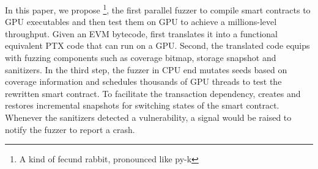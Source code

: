 In this paper, we propose {\tool}\footnote{A kind of fecund rabbit, pronounced like py-k}, the first parallel fuzzer to compile smart contracts to GPU executables and then test them on GPU to achieve a millions-level throughput.   
Given an EVM bytecode, {\tool} first translates it into a functional equivalent PTX code that can run on a GPU. 
Second, the translated code equips with fuzzing components such as coverage bitmap, storage snapshot and sanitizers. 
In the third step, the fuzzer in CPU end mutates seeds based on coverage information and schedules thousands of GPU threads to test the rewritten smart contract.
To facilitate the transaction dependency, {\tool} creates and restores incremental snapshots for switching states of the smart contract. 
Whenever the sanitizers detected a vulnerability, a signal would be raised to notify the fuzzer to report a crash.

